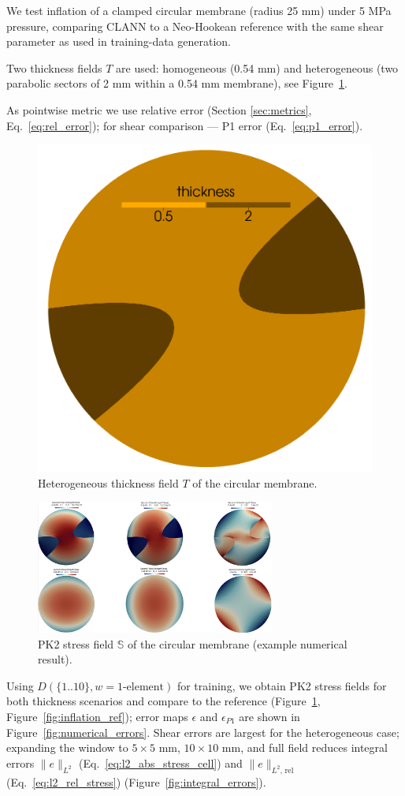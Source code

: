   We test inflation of a clamped circular membrane (radius 25 mm) under 5 MPa pressure, comparing CLANN to a Neo-Hookean reference with the same shear parameter as used in training-data generation.
  
  Two thickness fields $T$ are used: homogeneous (0.54 mm) and heterogeneous (two parabolic sectors of 2 mm within a 0.54 mm membrane), see Figure~\ref{fig:membrane_thickness}.

  As pointwise metric we use relative error (Section \ref{sec:metrics}, Eq.~\ref{eq:rel_error}); for shear comparison — P1 error \cite{xie2024p1} (Eq.~\ref{eq:p1_error}).

  \begin{figure}[H]
    \centering
    \includegraphics[width=0.25\linewidth]{../img/het_circle.png}
    \caption{Heterogeneous thickness field $T$ of the circular membrane.}
    \label{fig:membrane_thickness}
  \end{figure}

  \begin{figure}[H]
    \centering
    \includegraphics[width=0.7\textwidth]{../img/Numerical/ref_stress.png}
    \caption{PK2 stress field $\mathbb S$ of the circular membrane (example numerical result).}
    \label{fig:numerical_experiment}
  \end{figure}
  
  Using $D(\{1..10\}, w=\text{1-element})$ for training, we obtain PK2 stress fields for both thickness scenarios and compare to the reference (Figure~\ref{fig:membrane_thickness}, Figure~\ref{fig:inflation_ref}); error maps $\epsilon$ and $\epsilon_{P1}$ are shown in Figure~\ref{fig:numerical_errors}. Shear errors are largest for the heterogeneous case; expanding the window to $5\times 5$ mm, $10\times 10$ mm, and full field reduces integral errors $\|e\|_{L^2}$ (Eq.~\ref{eq:l2_abs_stress_cell}) and $\|e\|_{L^2,\,\mathrm{rel}}$ (Eq.~\ref{eq:l2_rel_stress}) (Figure~\ref{fig:integral_errors}).
  
